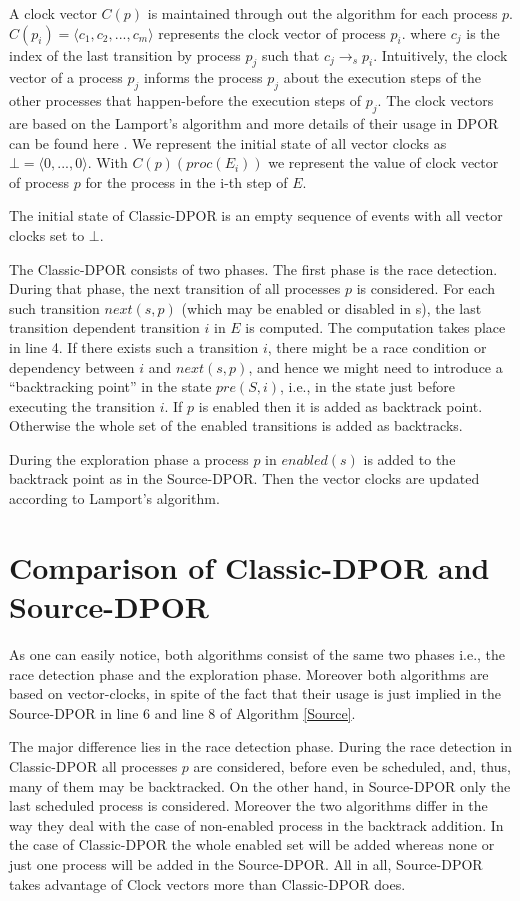 A clock vector $C(p)$ is maintained through out the algorithm for each process $p$. $C(p_i) = \langle c_1, c_2, ..., c_m \rangle$ represents the clock vector of process $p_i$.
where $c_j$ is the index of the last transition by process $p_j$ such that
$c_j \rightarrow_s p_i$. Intuitively, the clock vector of a process $p_j$ informs the process $p_j$ about the execution steps of the other processes that 
happen-before the execution steps of $p_j$. The clock vectors are based on the Lamport's algorithm \cite{Lamp} and more details of their usage in DPOR can
be found here \cite{FlanaganDPOR}. We represent the initial state of all vector clocks as $\bot = \langle 0, ..., 0 \rangle$. With $C(p)(proc(E_i ))$ we represent the 
value of clock vector of process $p$ for the process in the i-th step of $E$.

The initial state of Classic-DPOR is an empty sequence of events with all vector clocks set to $\bot$.

The Classic-DPOR consists of two phases. The first phase is the race detection. During that phase, the next transition
of all processes $p$ is considered.
For each such transition $next(s, p)$ (which may be enabled or disabled
in s), the last transition dependent transition  $i$ in $E$ is computed.
The computation takes place in line 4.
If there exists such a transition $i$, there might be a race
condition or dependency between $i$ and $next(s, p)$, and hence
we might need to introduce a “backtracking point” in the
state $pre(S, i)$, i.e., in the state just before executing the
transition $i$. If $p$ is enabled then it is added as backtrack point. Otherwise the whole set of the 
enabled transitions is added as backtracks.

During the exploration phase a process $p$ in $enabled(s)$ is added to the backtrack point as in the Source-DPOR. 
Then the vector clocks are updated according to Lamport's algorithm.

\section{Comparison of Classic-DPOR and Source-DPOR}

As one can easily notice, both algorithms consist of the same two phases i.e., the race detection phase and the exploration phase. Moreover both
algorithms are based on vector-clocks, in spite of the fact that their usage is just implied in the Source-DPOR in line 6 and line 8 of Algorithm \ref{Source}.

The major difference lies in the race detection phase. During the race detection in Classic-DPOR all processes $p$ are considered, before even be scheduled, and, thus, many of them
may be backtracked. On the other hand, in Source-DPOR only the last scheduled process is considered. Moreover the two algorithms differ in the way they deal with
the case of non-enabled process in the backtrack addition. In the case of Classic-DPOR the whole enabled set will be added whereas none or just one process will
be added in the Source-DPOR. All in all, Source-DPOR takes advantage of Clock vectors more than Classic-DPOR does.

